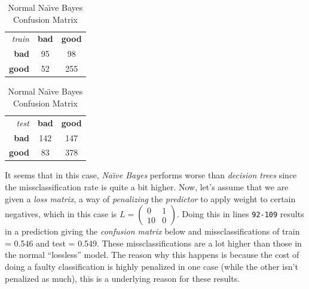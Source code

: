 \documentclass[a4paper, twocolumn]{article}
\begin{document}
        \begin{table}[h]
        \begin{center}
        \begin{tabular}{r|c|c|}
            \multicolumn{1}{r}{\emph{train}}
            &\multicolumn{1}{c}{\textbf{bad}}
            &\multicolumn{1}{c}{\textbf{good}} \\
            \cline{2-3}
            \textbf{bad} & 95 & 98 \\
            \cline{2-3}
            \textbf{good} & 52 & 255 \\
            \cline{2-3}
        \end{tabular}
        \begin{tabular}{r|c|c|}
            \multicolumn{1}{r}{\emph{test}}
            &\multicolumn{1}{c}{\textbf{bad}}
            &\multicolumn{1}{c}{\textbf{good}} \\
            \cline{2-3}
            \textbf{bad} & 142 & 147 \\
            \cline{2-3}
            \textbf{good} & 83 & 378 \\
            \cline{2-3}
        \end{tabular}
        \end{center}
        \caption{Normal Na{\"\i}ve Bayes Confusion Matrix}
        \label{table:bayes}
        \end{table}

        It seems that in this case, \emph{Na{\"\i}ve Bayes} performs worse than \emph{decision trees} since the missclassification rate is quite a bit higher. Now, let's assume that we are given a \emph{loss matrix}, a way of \emph{penalizing} the \emph{predictor} to apply weight to certain negatives, which in this case is $L = \left( \begin{smallmatrix}0&1\\10&0\end{smallmatrix} \right)$. Doing this in lines \texttt{92-109} results in a prediction giving the \emph{confusion matrix} below and missclassifications of train = 0.546 and test = 0.549. These missclassifications are a lot higher than those in the normal ``lossless'' model. The reason why this happens is because the cost of doing a faulty classification is highly penalized in one case (while the other isn't penalized as much), this is a underlying reason for these results.
\end{document}
